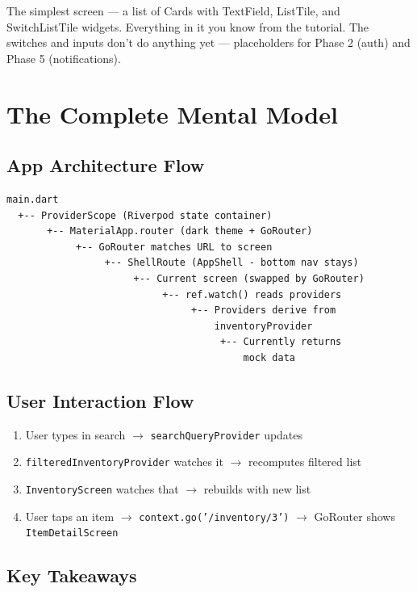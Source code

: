 \documentclass[11pt, a4paper]{article}
\begin{document}
The simplest screen --- a list of Cards with TextField, ListTile, and SwitchListTile widgets. Everything in it you know from the tutorial. The switches and inputs don't do anything yet --- placeholders for Phase 2 (auth) and Phase 5 (notifications).

\newpage

\section{The Complete Mental Model}

\subsection{App Architecture Flow}

\begin{lstlisting}[numbers=none]
main.dart
  +-- ProviderScope (Riverpod state container)
       +-- MaterialApp.router (dark theme + GoRouter)
            +-- GoRouter matches URL to screen
                 +-- ShellRoute (AppShell - bottom nav stays)
                      +-- Current screen (swapped by GoRouter)
                           +-- ref.watch() reads providers
                                +-- Providers derive from
                                    inventoryProvider
                                     +-- Currently returns
                                         mock data
\end{lstlisting}

\subsection{User Interaction Flow}

\begin{enumerate}
    \item User types in search $\rightarrow$ \texttt{searchQueryProvider} updates
    \item \texttt{filteredInventoryProvider} watches it $\rightarrow$ recomputes filtered list
    \item \texttt{InventoryScreen} watches that $\rightarrow$ rebuilds with new list
    \item User taps an item $\rightarrow$ \texttt{context.go('/inventory/3')} $\rightarrow$ GoRouter shows \texttt{ItemDetailScreen}
\end{enumerate}

\subsection{Key Takeaways}
\end{document}
